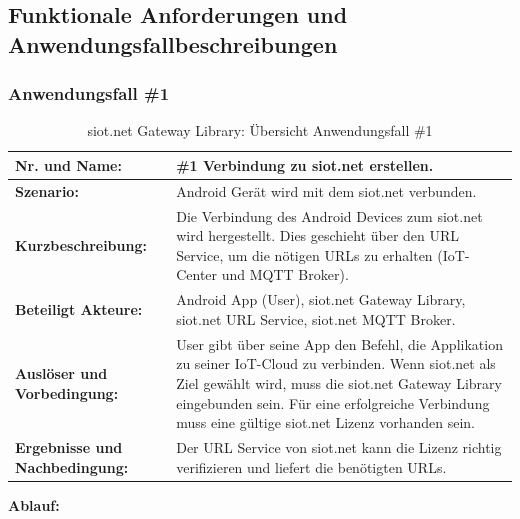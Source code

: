 \subsection{Funktionale Anforderungen und Anwendungsfallbeschreibungen}
\subsubsection{Anwendungsfall \#1}
\begin{table}[H]
\centering
\begin{tabular}{|>{\columncolor[gray]{0.8}}l|p{11.5cm}|}
\hline
\textbf{Nr. und Name:}                  & \#1 Verbindung zu siot.net erstellen. \\ \hline
\textbf{Szenario:}                      & Android Gerät wird mit dem siot.net verbunden. \\ \hline
\textbf{Kurzbeschreibung:}              & Die Verbindung des Android Devices zum siot.net wird hergestellt. Dies geschieht über den \gls{URL} Service, um die nötigen \gls{URL}s zu erhalten (\gls{IoT}-Center und \gls{MQTT} Broker). \\ \hline
\textbf{Beteiligt Akteure:}             & Android App (User), siot.net Gateway Library, siot.net \gls{URL} Service, siot.net \gls{MQTT} Broker. \\ \hline
\textbf{Auslöser und Vorbedingung:}     & User gibt über seine App den Befehl, die Applikation zu seiner \gls{IoT}-Cloud zu verbinden. Wenn siot.net als Ziel gewählt wird, muss die siot.net Gateway Library eingebunden sein. Für eine erfolgreiche Verbindung muss eine gültige siot.net Lizenz vorhanden sein. \\ \hline
\textbf{Ergebnisse und Nachbedingung:}  & Der \gls{URL} Service von siot.net kann die Lizenz richtig verifizieren und liefert die benötigten \gls{URL}s. \\ \hline
\end{tabular}
\caption{siot.net Gateway Library: Übersicht Anwendungsfall \#1}
\end{table}
\textbf{Ablauf:}
